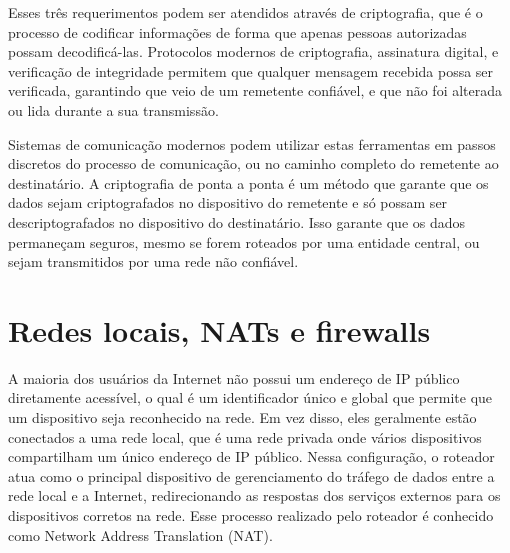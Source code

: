 


Esses três requerimentos podem ser atendidos através de criptografia, que é o processo de codificar informações de forma que apenas pessoas autorizadas possam decodificá-las. Protocolos modernos de criptografia, assinatura digital, e verificação de integridade permitem que qualquer mensagem recebida possa ser verificada, garantindo que veio de um remetente confiável, e que não foi alterada ou lida durante a sua transmissão.

Sistemas de comunicação modernos podem utilizar estas ferramentas em passos discretos do processo de comunicação, ou no caminho completo do remetente ao destinatário. A criptografia de ponta a ponta é um método que garante que os dados sejam criptografados no dispositivo do remetente e só possam ser descriptografados no dispositivo do destinatário. Isso garante que os dados permaneçam seguros, mesmo se forem roteados por uma entidade central, ou sejam transmitidos por uma rede não confiável.

\section {Redes locais, NATs e firewalls}

A maioria dos usuários da Internet não possui um endereço de IP público diretamente acessível, o qual é um identificador único e global que permite que um dispositivo seja reconhecido na rede. Em vez disso, eles geralmente estão conectados a uma rede local, que é uma rede privada onde vários dispositivos compartilham um único endereço de IP público. Nessa configuração, o roteador atua como o principal dispositivo de gerenciamento do tráfego de dados entre a rede local e a Internet, redirecionando as respostas dos serviços externos para os dispositivos corretos na rede. Esse processo realizado pelo roteador é conhecido como Network Address Translation (NAT).

